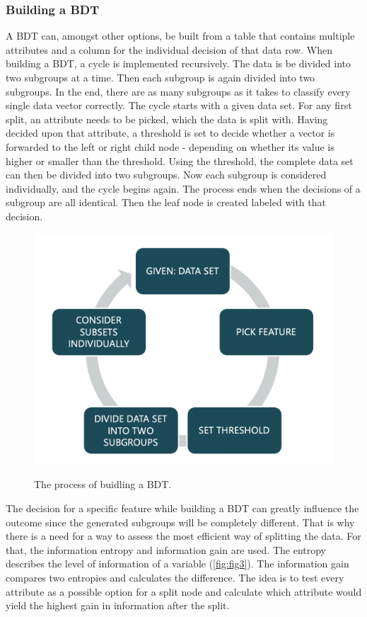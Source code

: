 \documentclass[
12pt,
headsepline,
bibliography=totoc,
twoside=semi,
fleqn
]{scrartcl}
\begin{document}
 \subsubsection{Building a BDT\label{sec:sec2-1-2}}
 A BDT can, amongst other options, be built from a table that contains multiple attributes and a column for the individual decision of that data row. When building a BDT, a cycle is implemented recursively. The data is be divided into two subgroups at a time. Then each subgroup is again divided into two subgroups. In the end, there are as many subgroups as it takes to classify every single data vector correctly. The cycle starts with a given data set. For any first split, an attribute needs to be picked, which the data is split with. Having decided upon that attribute, a threshold is set to decide whether a vector is forwarded to the left or right child node - depending on whether its value is higher or smaller than the threshold. Using the threshold, the complete data set can then be divided into two subgroups. Now each subgroup is considered individually, and the cycle begins again. The process ends when the decisions of a subgroup are all identical. Then the leaf node is created labeled with that decision. 

 \begin{figure}[H]
 \centering \includegraphics[scale=0.3]{BDT2.png}\label{fig:fig2}
 \caption{The process of buidling a BDT.}
 \end{figure}


 The decision for a specific feature while building a BDT can greatly influence the outcome since the generated subgroups will be completely different. That is why there is a need for a way to assess the most efficient way of splitting the data. For that, the information entropy and information gain are used. The entropy describes the level of information of a variable (\ref{fig:fig3}). The information gain compares two entropies and calculates the difference. The idea is to test every attribute as a possible option for a split node and calculate which attribute would yield the highest gain in information after the split. 
\end{document}
